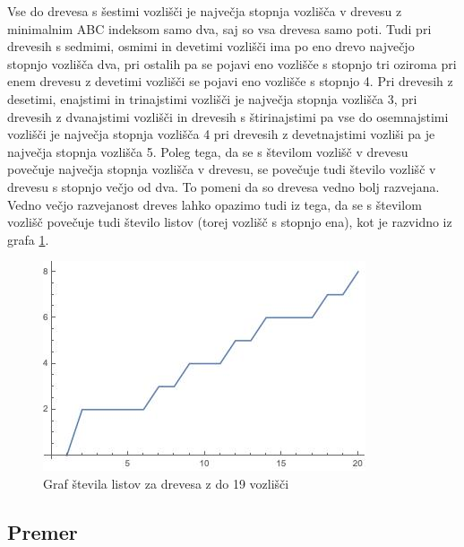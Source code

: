 \documentclass[a4paper,12 pt]{article}
\begin{document}
Vse do drevesa s šestimi vozlišči je največja stopnja vozlišča v drevesu z minimalnim ABC indeksom samo dva, saj so vsa drevesa samo poti. Tudi pri drevesih s sedmimi, osmimi in devetimi vozlišči ima po eno drevo največjo stopnjo vozlišča dva, pri ostalih pa se pojavi eno vozlišče s stopnjo tri oziroma pri enem drevesu z devetimi vozlišči se pojavi eno vozlišče s stopnjo 4. Pri drevesih z desetimi, enajstimi in trinajstimi vozlišči je največja stopnja vozlišča 3, pri drevesih z dvanajstimi vozlišči in drevesih s štirinajstimi pa vse do osemnajstimi vozlišči je največja stopnja vozlišča 4 pri drevesih z devetnajstimi vozliši pa je največja stopnja vozlišča 5. Poleg tega, da se s številom vozlišč v drevesu povečuje največja stopnja vozlišča v drevesu, se povečuje tudi število vozlišč v drevesu s stopnjo večjo od dva. To pomeni da so drevesa vedno bolj razvejana. Vedno večjo razvejanost dreves lahko opazimo tudi iz tega, da se s številom vozlišč povečuje tudi število listov (torej vozlišč s stopnjo ena), kot je razvidno iz grafa \ref{fig:listi}.
\begin{figure}
  \includegraphics[width=\linewidth]{Stevilo_listov.jpg}
  \caption{Graf števila listov za drevesa z do 19 vozlišči}
  \label{fig:listi}
\end{figure}

\subsection[Premer]{Premer}
\end{document}
